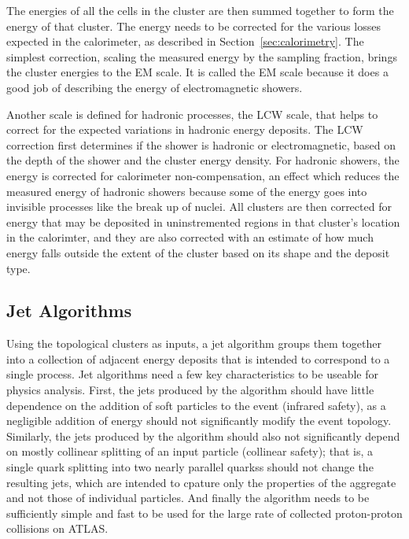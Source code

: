 The energies of all the cells in the cluster are then summed together to form the energy of that cluster.
The energy needs to be corrected for the various losses expected in the calorimeter, as described in Section~\ref{sec:calorimetry}.
The simplest correction, scaling the measured energy by the sampling fraction, brings the cluster energies to the \ac{EM} scale.
It is called the \ac{EM} scale because it does a good job of describing the energy of electromagnetic showers. 

Another scale is defined for hadronic processes, the \ac{LCW} scale, that helps to correct for the expected variations in hadronic energy deposits.
The \ac{LCW} correction first determines if the shower is hadronic or electromagnetic, based on the depth of the shower and the cluster energy density.
For hadronic showers, the energy is corrected for calorimeter non-compensation, an effect which reduces the measured energy of hadronic showers because some of the energy goes into invisible processes like the break up of nuclei.
All clusters are then corrected for energy that may be deposited in uninstremented regions in that cluster's location in the calorimter, and they are also corrected with an estimate of how much energy falls outside the extent of the cluster based on its shape and the deposit type.

\subsection{Jet Algorithms}
Using the topological clusters as inputs, a jet algorithm groups them together into a collection of adjacent energy deposits that is intended to correspond to a single process.
Jet algorithms need a few key characteristics to be useable for physics analysis.
First, the jets produced by the algorithm should have little dependence on the addition of soft particles to the event (infrared safety), as a negligible addition of energy should not significantly modify the event topology.
Similarly, the jets produced by the algorithm should also not significantly depend on mostly collinear splitting of an input particle (collinear safety); that is, a single quark splitting into two nearly parallel quarkss should not change the resulting jets, which are intended to cpature only the properties of the aggregate and not those of individual particles.
And finally the algorithm needs to be sufficiently simple and fast to be used for the large rate of collected proton-proton collisions on \ac{ATLAS}.

